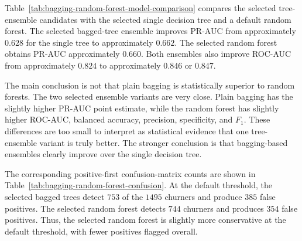 Table~\ref{tab:bagging-random-forest-model-comparison} compares the selected tree-ensemble candidates with the selected single decision tree and a default random forest. The selected bagged-tree ensemble improves PR-AUC from approximately \(0.628\) for the single tree to approximately \(0.662\). The selected random forest obtains PR-AUC approximately \(0.660\). Both ensembles also improve ROC-AUC from approximately \(0.824\) to approximately \(0.846\) or \(0.847\).

\begin{table}[H]
\centering
\small
{}
\caption{Cross-validated bagging and random-forest model comparison on the training set}
\label{tab:bagging-random-forest-model-comparison}
\end{table}

The main conclusion is not that plain bagging is statistically superior to random forests. The two selected ensemble variants are very close. Plain bagging has the slightly higher PR-AUC point estimate, while the random forest has slightly higher ROC-AUC, balanced accuracy, precision, specificity, and \(F_1\). These differences are too small to interpret as statistical evidence that one tree-ensemble variant is truly better. The stronger conclusion is that bagging-based ensembles clearly improve over the single decision tree.

The corresponding positive-first confusion-matrix counts are shown in Table~\ref{tab:bagging-random-forest-confusion}. At the default threshold, the selected bagged trees detect \(753\) of the \(1495\) churners and produce \(385\) false positives. The selected random forest detects \(744\) churners and produces \(354\) false positives. Thus, the selected random forest is slightly more conservative at the default threshold, with fewer positives flagged overall.

